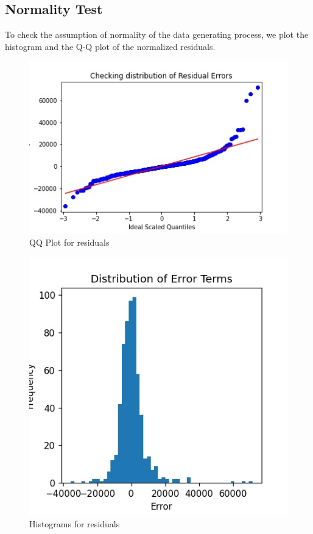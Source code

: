 \documentclass[12pt]{article}
\begin{document}
\pagebreak
\subsection{Normality Test}
To check the assumption of normality of the data generating process, we  plot the histogram and the Q-Q plot of the normalized residuals.

\begin{figure}[h]
\centering
\includegraphics[scale=.75]{images/residual-qqplot.jpg}
\caption{QQ Plot for residuals}
\end{figure}

\begin{figure}[h]
\centering
\includegraphics[scale=.8]{images/residual-histogram.jpg}
\caption{Histograms for residuals}
\end{figure}
\end{document}
